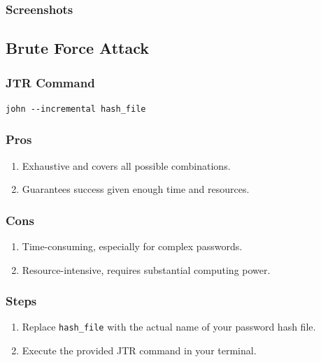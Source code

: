 \documentclass[11pt]{article}
\begin{document}
\subsubsection{Screenshots}

\subsection{Brute Force Attack}

\subsubsection{JTR Command}

\begin{verbatim}
john --incremental hash_file
\end{verbatim}

\subsubsection{Pros}

\begin{enumerate}
    \item Exhaustive and covers all possible combinations.
    \item Guarantees success given enough time and resources.
\end{enumerate}

\subsubsection{Cons}

\begin{enumerate}
    \item Time-consuming, especially for complex passwords.
    \item Resource-intensive, requires substantial computing power.
\end{enumerate}

\subsubsection{Steps}

\begin{enumerate}
    \item Replace \texttt{hash\_file} with the actual name of your password hash file.
    \item Execute the provided JTR command in your terminal.
\end{enumerate}
\end{document}

